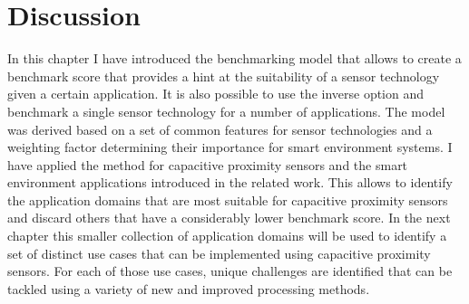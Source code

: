 \section{Discussion}
In this chapter I have introduced the benchmarking model that allows to create a benchmark score that provides a hint at the suitability of a sensor technology given a certain application. It is also possible to use the inverse option and benchmark a single sensor technology for a number of applications. The model was derived based on a set of common features for sensor technologies and a weighting factor determining their importance for smart environment systems. I have applied the method for capacitive proximity sensors and the smart environment applications introduced in the related work. This allows to identify the application domains that are most suitable for capacitive proximity sensors and discard others that have a considerably lower benchmark score. In the next chapter this smaller collection of application domains will be used to identify a set of distinct use cases that can be implemented using capacitive proximity sensors. For each of those use cases, unique challenges are identified that can be tackled using a variety of new and improved processing methods.